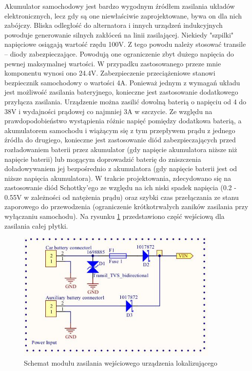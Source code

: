 Akumulator samochodowy jest bardzo wygodnym źródłem zasilania układów elektronicznych, lecz gdy są one niewłaściwie zaprojektowane, bywa on dla nich zabójczy. Bliska odległość do alternatora i innych urządzeń indukcyjnych powoduje generowanie silnych zakłóceń na linii zasilającej. Niekiedy "szpilki" napięciowe osiągają wartość rzędu 100V. Z tego powodu należy stosować transile – diody zabezpieczające. Powodują one ograniczenie zbyt dużego napięcia do pewnej maksymalnej wartości. W przypadku zastosowanego przeze mnie komponentu wynosi ono 24.4V. Zabezpieczenie przeciążeniowe stanowi bezpiecznik samochodowy o wartości 4A. 
Ponieważ jednym z wymagań układu jest możliwość zasilania bateryjnego, konieczne jest zastosowanie dodatkowego przyłącza zasilania. Urządzenie można zasilić dowolną baterią o napięciu od 4 do 38V i wydajności prądowej co najmniej 3A w szczycie. Ze względu na prawdopodobieństwo wystąpienia różnic napięć pomiędzy dodatkowa baterią, a akumulatorem samochodu i wiążącym się z tym przepływem prądu z jednego źródła do drugiego, konieczne jest zastosowanie diód zabezpieczających przed rozładowaniem baterii przez akumulator (gdy napięcie akumulatora niższe niż napięcie baterii) lub mogącym doprowadzić baterię do zniszczenia doładowywaniem jej bezpośrednio z akumulatora (gdy napięcie baterii jest od niższe napięcia akumulatora). W trakcie projektowania, zdecydowano się na zastosowanie diód Schottky’ego ze względu na ich niski spadek napięcia (0.2 - 0.55V w zależności od natężenia prądu) oraz szybki czas przełączania ze stanu zaporowego do przewodzenia (ograniczenie krótkotrwałych zaników zasilania przy wyłączaniu samochodu). Na rysunku \ref{fig:image_mainboard_power_input} przedstawiono część wejściową dla zasilania całej płytki.

\begin{figure}[H]
	\centering
	\includegraphics[width=10cm]{img/schematics/mainboard_power_input.jpg}
	\caption{Schemat modułu zasilania wejściowego urządzenia lokalizującego}
	\label{fig:image_mainboard_power_input}
\end{figure}


